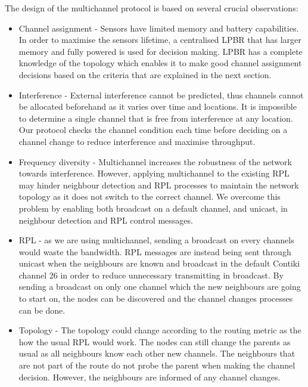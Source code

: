 The design of the multichannel protocol is based on several crucial observations:
\begin{itemize}
\item Channel assignment - Sensors have limited memory and battery capabilities. In order to maximise the sensors lifetime, a centralised LPBR that has larger memory and fully powered is used for decision making. LPBR has a complete knowledge of the topology which enables it to make good channel assignment decisions based on the criteria that are explained in the next section. 

\item Interference - External interference cannot be predicted, thus channels cannot be allocated beforehand as it varies over time and locations. It is impossible to determine a single channel that is free from interference at any location. Our protocol checks the channel condition each time before deciding on a channel change to reduce interference and maximise throughput.

\item Frequency diversity - Multichannel increases the robustness of the network towards interference. However, applying multichannel to the existing RPL may hinder neighbour detection and RPL processes to maintain the network topology as it does not switch to the correct channel. We overcome this problem by enabling both broadcast on a default channel, and unicast, in neighbour detection and RPL control messages. 

\item RPL - as we are using multichannel, sending a broadcast on every channels would waste the bandwidth. RPL messages are instead being sent through unicast when the neighbours are known and broadcast in the default Contiki channel 26 in order to reduce unnecessary transmitting in broadcast. By sending a broadcast on only one channel which the new neighbours are going to start on, the nodes can be discovered and the channel changes processes can be done. 

\item Topology - The topology could change according to the routing metric as the how the usual RPL would work. The nodes can still change the parents as usual as all neighbours know each other new channels. The neighbours that are not part of the route do not probe the parent when making the channel decision. However, the neighbours are informed of any channel changes.

\end{itemize}

